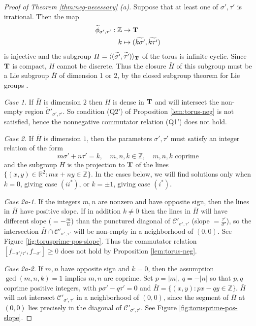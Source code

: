 \documentclass[11pt, letterpaper, reqno]{amsart}
\theoremstyle{definition}
\theoremstyle{remark}
\numberwithin{equation}{section}
\newcommand{\RR}{\ensuremath{\mathbb{R}}}
\newcommand{\ZZ}{\ensuremath{\mathbb{Z}}}
\newcommand{\bT}{{\bf T}}
\newcommand{\cCprime}{{\mathcal{C}'}}
\newcommand{\cCprimebar}{\widetilde{\mathcal{C}}'}
\newcommand{\tbetap}{{\sigma'}}
\newcommand{\trhop}{{\tau'}}
\begin{document}

\begin{proof}[Proof of Theorem \ref{thm:neg-necessary} (a)]
Suppose that at least one of $\tbetap, \trhop$ is irrational. 
Then the map
\begin{align*}
\widetilde{\phi}_{\tbetap, \trhop} : \ZZ &\to \bT \\
k &\mapsto (\widetilde{k\tbetap}, \widetilde{k\trhop})
\end{align*}
is injective and the subgroup $H = \langle (\widetilde{\tbetap},\widetilde{\trhop}) \rangle_{\bT}$ 
of the torus is infinite cyclic. 
Since $\bT$ is compact, $H$ cannot be discrete.
Thus the closure $\bar{H}$ of this subgroup  must be a Lie subgroup $\bar{H}$ of dimension 1 or 2, by 
the closed subgroup theorem for Lie groups
\cite[Theorem 20.12, p. 523]{Lee13}.


{\em Case 1.} If $\bar{H}$ is dimension $2$ then $H$ is dense in $\bT$
and will intersect the non-empty region $\cCprimebar_{\tbetap,\trhop}$. 
So condition (Q2') of  Proposition \ref{lem:torus-neg} is not satisfied, hence  
the nonnegative commutator relation (Q1') does not hold.

{\em Case 2.} If $\bar{H}$  is dimension $1$, then the parameters $\tbetap,\trhop$ must satisfy 
an  integer relation of the form
\begin{equation*}
m\tbetap + n\trhop = k, \quad m,n,k \in \ZZ ,\quad m, n,k\text{ coprime}%
\end{equation*}
and the subgroup $\bar{H}$ is the projection to $\bT$ of the lines
 $\{ (x,y)\in \RR^2 : mx + ny \in \ZZ \}$.
 In the cases below, we will find solutions only when $k=0$, giving case $(ii^{\ast})$,
 or $k = \pm 1$, giving case $(i^{\ast})$. 

{\em Case 2a-1.} If the integers $m,n$ are nonzero and have opposite sign, 
then the lines in $\bar{H}$ have positive slope. 
If in addition $k\neq 0$ then the lines in $\bar{H}$ 
will have different slope ($ = -\frac{m}{n}$) than 
the punctured diagonal of $\cCprime_{\tbetap,\trhop}$ (slope $= \frac{\trhop}{\tbetap}$), 
so the  intersection $\bar{H}\cap \cCprime_{\tbetap,\trhop}$ 
 will be non-empty in a neighborhood of $(0,0)$.
See Figure \ref{fig:torusprime-pos-slope}.
Thus the commutator relation $[f_{-\tbetap/\trhop}, f_{-\tbetap}]\geq 0$ does 
not hold by Proposition \ref{lem:torus-neg}.

{\em Case 2a-2.} If $m,n$ have opposite sign and $k = 0$, 
then the assumption $\gcd(m,n,k) = 1$ implies $m,n$ are coprime.
Set $p=|m|$, $q=-|n|$ so that $p,q$ coprime positive integers, with $p\tbetap - q\trhop =0$ and 
$\bar{H} = \{(x,y) : px - qy \in \ZZ\}$.
$\bar{H}$ will not  intersect $\cCprime_{\tbetap,\trhop}$ in a neighborhood of $(0,0)$, since the segment of $\bar{H}$ at $(0,0)$ lies precisely in the diagonal  of $\cCprime_{\tbetap,\trhop}$. 
See Figure \ref{fig:torusprime-pos-slope}.


\end{proof}
\end{document}
